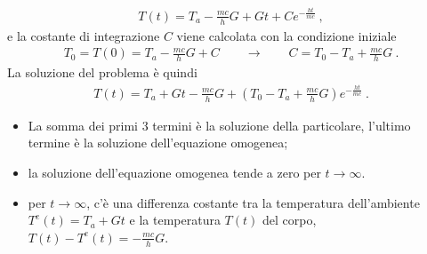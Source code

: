 \documentclass[letterpaper,10pt,italian]{jupyterBook}
\begin{document}
\begin{equation*}
\begin{split}T(t) = T_a - \frac{mc}{h}G + G t + C e^{-\frac{h t}{m c}} \ ,\end{split}
\end{equation*}
\sphinxAtStartPar
e la costante di integrazione \(C\) viene calcolata con la condizione iniziale
\begin{equation*}
\begin{split}T_0 = T(0) = T_a - \frac{mc}{h} G + C \qquad \rightarrow \qquad C = T_0 - T_a + \frac{mc}{h} G \ .\end{split}
\end{equation*}
\sphinxAtStartPar
La soluzione del problema è quindi
\begin{equation*}
\begin{split}
  T(t) = T_a + G t - \frac{mc}{h}G + \left( T_0 - T_a + \frac{mc}{h} G \right) e^{-\frac{h t}{m c}} \ .
\end{split}
\end{equation*}\begin{itemize}
\item {} 
\sphinxAtStartPar
La somma dei primi 3 termini è la soluzione della particolare, l’ultimo termine è la soluzione dell’equazione omogenea;

\item {} 
\sphinxAtStartPar
la soluzione dell’equazione omogenea tende a zero per \(t \rightarrow \infty\).

\item {} 
\sphinxAtStartPar
per \(t \rightarrow \infty\), c’è una differenza costante tra la temperatura dell’ambiente \(T^e(t) = T_a + Gt\) e la temperatura \(T(t)\) del corpo, \(T(t) - T^e(t) = -\frac{mc}{h} G\).

\end{itemize}
\end{document}
